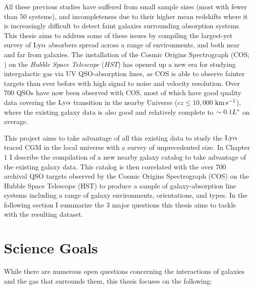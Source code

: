 \documentclass[twocolumn,tighten]{aastex62}
\newcommand{\kms}{$\rm km\, s^{-1}$}
\begin{document}
All these previous studies have suffered from small sample sizes (most with fewer than 50 systems), and incompleteness due to their higher mean redshifts where it is increasingly difficult to detect faint galaxies surrounding absorption systems. This thesis aims to address some of these issues by compiling the largest-yet survey of $\rm Ly\alpha$ absorbers spread across a range of environments, and both near and far from galaxies. The installation of the Cosmic Origins Spectrograph (COS; \citealt{green2012}) on the \emph{Hubble Space Telescope} ($HST$) has opened up a new era for studying intergalactic gas via UV QSO-absorption lines, as COS is able to observe fainter targets than ever before with high signal to noise and velocity resolution. Over 700 QSOs have now been observed with COS, most of which have good quality data covering the $\rm Ly\alpha$ transition in the nearby Universe ($cz \leq 10,000$ \kms), where the existing galaxy data is also good and relatively complete to $\sim 0.1 L^{\**}$ on average. 

This project aims to take advantage of all this existing data to study the $\rm Ly\alpha$ traced CGM in the local universe with a survey of unprecedented size. In Chapter 1 I describe the compilation of a new nearby galaxy catalog to take advantage of the existing galaxy data. This catalog is then correlated with the over 700 archival QSO targets observed by the Cosmic Origins Spectrograph (COS) on the Hubble Space Telescope (HST) to produce a sample of galaxy-absorption line systems including a range of galaxy environments, orientations, and types. In the following section I summarize the 3 major questions this thesis aims to tackle with the resulting dataset.





\section{Science Goals}
While there are numerous open questions concerning the interactions of galaxies and the gas that surrounds them, this thesis focuses on the following:

\end{document}
